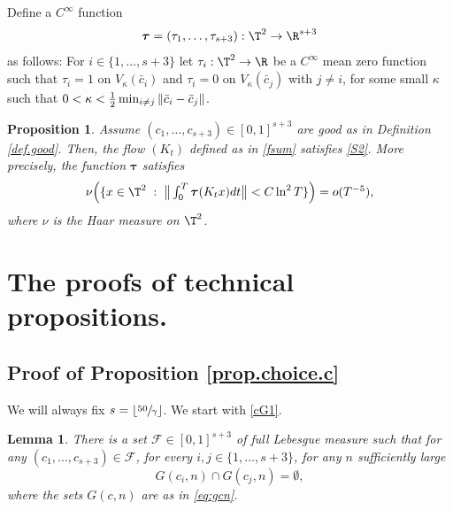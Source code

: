 \documentclass[JEP,XML,SOM,Unicode,NoFloatCountersInSection]{cedram}
\let\DS\relax
\let\ts\textstyle
\newcommand\cF{\mathcal{F}}
\newcommand\btau{{\boldsymbol{\tau}}}
\theoremstyle{definition}
\theoremstyle{plain}
\newtheorem{lemma}[definition]{Lemma}
\newtheorem{proposition}[definition]{Proposition}
\begin{document}
Define a $C^\infty$ function
\[
\btau=(\tau_1,\ldots,\tau_{s+3}):\T^2\to \R^{s+3}
\]
as follows: For $i\in\{1,\ldots, s+3\}$ let $\tau_i:\T^2\to \R$ be a $C^\infty$ mean zero function such that $\tau_i=1$ on $V_\kappa (\bar{c}_i)$ and $\tau_i=0$ on $V_\kappa(\bar{c}_j)$ with $j\neq i$, for some small $\kappa$ such that $\DS 0<\kappa<\frac{1}{2}\min_{i\neq j}\|\bar{c}_i-\bar{c}_j\|$.

\begin{proposition} \label{prop.choice.tau} Assume $(c_1,\ldots,c_{s+3})\in [0,1]^{s+3}$ are {\it good} as in Definition \ref{def.good}. Then, the flow $(K_t)$ defined as in \eqref{fsum} satisfies \eqref{S2}. More precisely, the function $\btau$ satisfies
\[\ts
\nu\Big(\{x\in \T^2\;:\; \big\|\int_0^T\btau(K_tx)dt\big\|<C\ln^2 T \}\Big)=o(T^{-5}),
\]
where $\nu$ is the Haar measure on $\T^2$.
\end{proposition}

\section{The proofs of technical propositions.}
\label{ScTechnical}
\subsection{Proof of Proposition \ref{prop.choice.c}} \label{sec.c.choice}
We will always fix $s=\lfloor \sfrac{50}{\gamma} \rfloor$.
We start with \eqref{cG1}.
\begin{lemma} \label{lemma.G1} There is a set $\cF\in [0,1]^{s+3}$ of full Lebesgue measure such that for any $(c_1,\ldots,c_{s+3})\in \cF$, for every $i,j \in \{1,\ldots, s+3\}$, for any $n$ sufficiently large
\[
G(c_i,n)\cap G(c_j,n)=\emptyset,
\]
where the sets $G(c,n)$ are as in \eqref{eq:gcn}.
\end{lemma}
\end{document}
